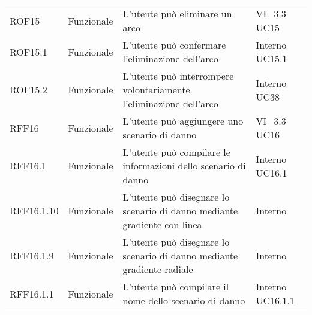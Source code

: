 \begin{longtable}{p{2cm}!{\VRule[1pt]}p{2cm}!{\VRule[1pt]}p{5cm}!{\VRule[1pt]}p{1.5cm}}
	\\
	ROF15                            & Funzionale\newline               & L'utente può eliminare un arco                                                                                           & VI_3.3 \newline UC15         
	\\
	ROF15.1                          & Funzionale\newline               & L'utente può confermare l'eliminazione dell'arco                                                                         & Interno \newline UC15.1      
	\\
	ROF15.2                          & Funzionale\newline               & L'utente può interrompere volontariamente l'eliminazione dell'arco                                                       & Interno \newline UC38        
	\\
	RFF16                            & Funzionale\newline               & L'utente può aggiungere uno scenario di danno                                                                            & VI_3.3 \newline UC16         
	\\
	RFF16.1                          & Funzionale\newline               & L'utente può compilare le informazioni dello scenario di danno                                                           & Interno \newline UC16.1      
	\\
	RFF16.1.10                       & Funzionale\newline               & L'utente può disegnare lo scenario di danno mediante gradiente con linea                                                 & Interno                      \\
	RFF16.1.9                        & Funzionale\newline               & L'utente può disegnare lo scenario di danno mediante gradiente radiale                                                   & Interno                      \\
	RFF16.1.1                        & Funzionale\newline               & L'utente può compilare il nome dello scenario di danno                                                                   & Interno \newline UC16.1.1    

\end{longtable}
